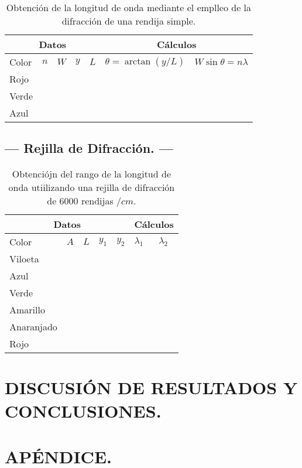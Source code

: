 \documentclass[12pt,a4paper]{article}
\begin{document}
\begin{table}[hbtp!]
	\centering
	\caption{Obtención de la longitud de onda mediante el emplleo de la difracción de una rendija simple.}
	\begin{tabular}{*{5}{l}|*{2}{l}}
		\hline
		\multicolumn{5}{c|}{Datos} & \multicolumn{2}{c}{Cálculos} \\ \hline
		Color & \(n\) & \(W\) & \(y\) & \(L\) & \(\theta = \arctan (y/L) \) & \(W \sin \theta = n \lambda\) \\ \hline
		Rojo &&&&&& \\ \hline
		Verde &&&&&& \\ \hline
		Azul &&&&&& \\ \hline
	\end{tabular}
	\label{tab:longitud_onda}
\end{table}


\subsection{--- Rejilla de Difracción. ---} %
\label{sub:resul_reijlla_de_difraccion}
\begin{table}[hbtp!]
	\centering
	\caption{Obtenciójn del rango de la longitud de onda utiilizando una rejilla de difracción de \(6000\) rendijas \(/cm\).} 
	\begin{tabular}{*{5}{l}|*{2}{l}}
		\hline 
		\multicolumn{5}{c|}{Datos} & \multicolumn{2}{c}{Cálculos} \\ \hline
		Color & \(A\) & \(L\) & \(y_1\) & \(y_2\) & \(\lambda _1\) & \(\lambda _2\) \\ \hline
		Viloeta &&&&&& \\ \hline
		Azul &&&&&& \\ \hline
		Verde &&&&&& \\ \hline
		Amarillo &&&&&& \\ \hline
		Anaranjado &&&&&& \\ \hline
		Rojo &&&&&& \\ \hline
	\end{tabular}
	\label{tab:longtud_por_difraccion}
\end{table}


\section{DISCUSIÓN DE RESULTADOS Y CONCLUSIONES.} %

% 
% 

\section{APÉNDICE.} %
\end{document}
